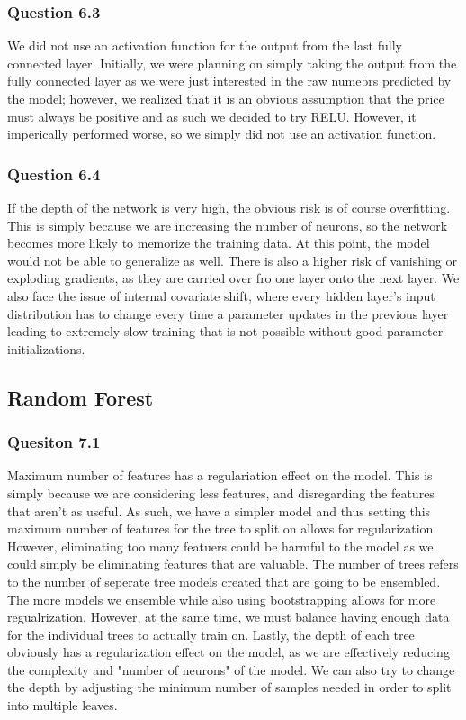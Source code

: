 \documentclass[11pt,letterpaper]{article}
\begin{document}
\subsubsection*{Question 6.3}
We did not use an activation function for the output from the last fully connected layer. Initially, we were planning on 
simply taking the output from the fully connected layer as we were just interested in the raw numebrs predicted by 
the model; however, we realized that it is an obvious assumption that the price must always be positive and as such
we decided to try RELU. However, it imperically performed worse, so we simply did not use an activation function. 
\subsubsection*{Question 6.4}
If the depth of the network is very high, the obvious risk is of course overfitting. This is simply because we are
increasing the number of neurons, so the network becomes more likely to memorize the training data. At this point,
the model would not be able to generalize as well. There is also a higher risk of vanishing or exploding gradients,
as they are carried over fro one layer onto the next layer. We also face the issue of internal covariate shift, 
where every hidden layer's input distribution has to change every time a parameter updates in the previous layer 
leading to extremely slow training that is not possible without good parameter initializations. 
\subsection*{Random Forest}
\subsubsection*{Quesiton 7.1}
Maximum number of features has a regulariation effect on the model. This is simply because we are considering less 
features, and disregarding the features that aren't as useful. As such, we have a simpler model and thus 
setting this maximum number of features for the tree to split on allows for regularization. However, eliminating
too many featuers could be harmful to the model as we could simply be eliminating features that are valuable.
The number of trees refers to the number of seperate tree models created that are going to be ensembled. The more models
we ensemble while
also using bootstrapping allows for more regualrization. However, at the same time, we must balance having enough data 
for the individual trees to actually train on. Lastly, the depth of each tree obviously has a regularization effect 
on the model, as we are effectively reducing the complexity and "number of neurons" of the model. We can also try 
to change the depth by adjusting the minimum number of samples needed in order to split into multiple leaves. 
\end{document}
